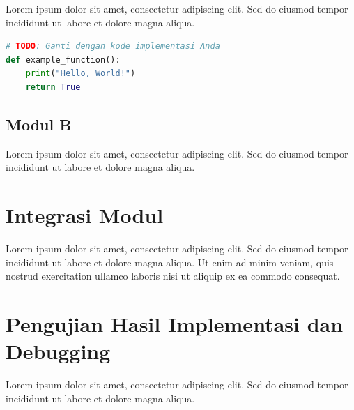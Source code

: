 Lorem ipsum dolor sit amet, consectetur adipiscing elit. Sed do eiusmod tempor incididunt ut labore et dolore magna aliqua.

\begin{lstlisting}[language=python, caption={Contoh Implementasi Modul A}]
# TODO: Ganti dengan kode implementasi Anda
def example_function():
    print("Hello, World!")
    return True
\end{lstlisting}

\subsection{Modul B}


Lorem ipsum dolor sit amet, consectetur adipiscing elit. Sed do eiusmod tempor incididunt ut labore et dolore magna aliqua.

\section{Integrasi Modul}


Lorem ipsum dolor sit amet, consectetur adipiscing elit. Sed do eiusmod tempor incididunt ut labore et dolore magna aliqua. Ut enim ad minim veniam, quis nostrud exercitation ullamco laboris nisi ut aliquip ex ea commodo consequat.

\section{Pengujian Hasil Implementasi dan Debugging}


Lorem ipsum dolor sit amet, consectetur adipiscing elit. Sed do eiusmod tempor incididunt ut labore et dolore magna aliqua.

